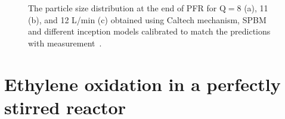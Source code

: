 \begin{figure}[H]
	\centering
	\caption{The particle size distribution at the end of PFR for $\mathrm{Q}=8$ (a), 11 (b), and 12 L/min (c) obtained using Caltech mechanism, SPBM and different inception models calibrated to match the predictions with measurement~\citep{mei2019quantitative}.}
	\label{fig:pfr_psd_caltech} 
\end{figure}


\section{Ethylene oxidation in a perfectly stirred reactor}

